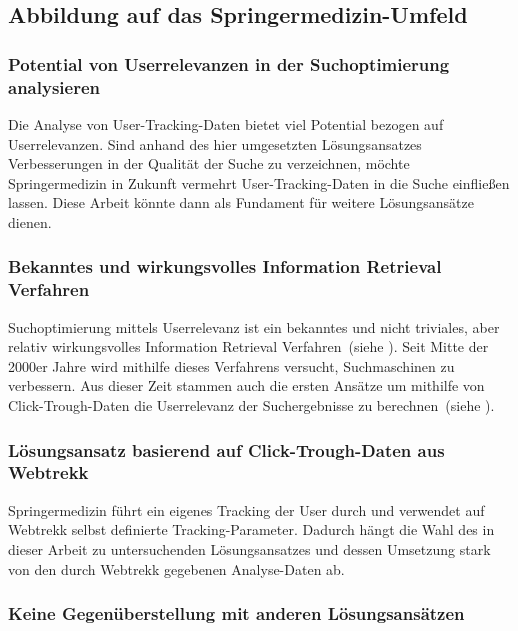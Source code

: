 \subsection{Abbildung auf das Springermedizin-Umfeld}
\label{sec:Einfuehrung:ZielArbeit:AbbildungSpringermedizinUmfeld}

\subsubsection{Potential von Userrelevanzen in der Suchoptimierung analysieren}
\label{sec:Einfuehrung:ZielArbeit:Potential}

Die Analyse von User-Tracking-Daten bietet viel Potential bezogen auf Userrelevanzen. Sind anhand des hier umgesetzten Lösungsansatzes Verbesserungen in der Qualität der Suche zu verzeichnen, möchte Springermedizin in Zukunft vermehrt User-Tracking-Daten in die Suche einfließen lassen. Diese Arbeit könnte dann als Fundament für weitere Lösungsansätze dienen.

\subsubsection{Bekanntes und wirkungsvolles Information Retrieval Verfahren}
\label{sec:Einfuehrung:ZielArbeit:AbbildungSpringermedizinUmfeld:InformationRetrievalVerfahren}

Suchoptimierung mittels Userrelevanz ist ein bekanntes und nicht triviales, aber relativ wirkungsvolles Information Retrieval Verfahren~(siehe \cite{IWUSBI}). Seit Mitte der 2000er Jahre wird mithilfe dieses Verfahrens versucht, Suchmaschinen zu verbessern. Aus dieser Zeit stammen auch die ersten Ansätze um mithilfe von Click-Trough-Daten die Userrelevanz der Suchergebnisse zu berechnen~(siehe \cite{Joachims}).

\subsubsection{Lösungsansatz basierend auf Click-Trough-Daten aus Webtrekk}
\label{sec:Einfuehrung:ZielArbeit:AbbildungSpringermedizinUmfeld:Loesungsansatz}

Springermedizin führt ein eigenes Tracking der User durch und verwendet auf Webtrekk selbst definierte Tracking-Parameter. Dadurch hängt die Wahl des in dieser Arbeit zu untersuchenden Lösungsansatzes und dessen Umsetzung stark von den durch Webtrekk gegebenen Analyse-Daten ab.

\subsubsection{Keine Gegenüberstellung mit anderen Lösungsansätzen}
\label{sec:Einfuehrung:ZielArbeit:AbbildungSpringermedizinUmfeld:NichtBehandeln}

